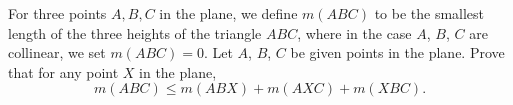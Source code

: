 For three points $A,B,C$ in the plane, we define $m(ABC)$ to be the smallest length of the three heights of the triangle $ABC$,  where in the case $A$,  $B$,  $C$ are collinear, we set $m(ABC) = 0$. Let $A$,  $B$,  $C$ be given points in the plane. Prove that for any point $X$ in the plane,\[ m(ABC) \leq m(ABX) + m(AXC) + m(XBC).  \]